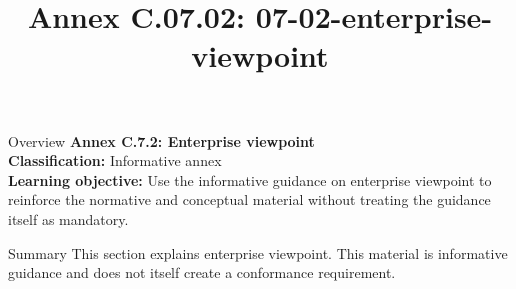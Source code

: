 \documentclass[10pt,letterpaper]{article}
\title{Annex C.07.02: 07-02-enterprise-viewpoint}
\author{}
\date{}
\begin{document}
\maketitle
\begin{CornellOverviewBox}{Overview}
{\Large\bfseries\textcolor{CNavy}{Annex C.7.2: Enterprise viewpoint}}\\[3pt]
{\small\textbf{Classification:} Informative annex}\\
{\small\textbf{Learning objective:} Use the informative guidance on enterprise viewpoint to reinforce the normative and conceptual material without treating the guidance itself as mandatory.}
\end{CornellOverviewBox}
\vspace{3pt}

\begin{CornellNotesTable}
\end{CornellNotesTable}


\begin{CornellSummaryBox}{Summary}
This section explains enterprise viewpoint. This material is informative guidance and does not itself create a conformance requirement.
\end{CornellSummaryBox}
\end{document}
